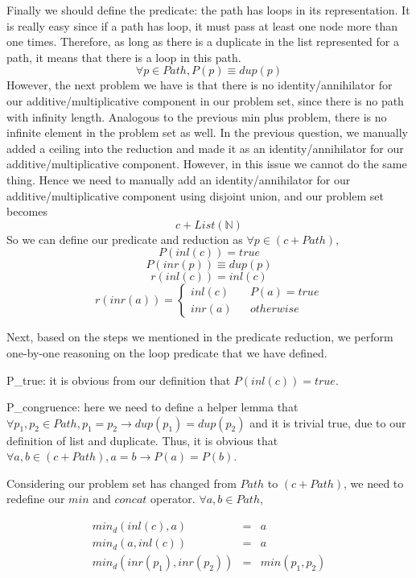 \documentclass[a4paper,10pt]{article}
\newcommand{\e}[2]{
\begin{equation}
  \label{#1} 
  #2
\end{equation}
}
\begin{document}
Finally we should define the predicate: the path has loops in its representation. It is really easy since if a path has loop, it must pass at least one node more than one times. 
Therefore, as long as there is a duplicate in the list represented for a path, it means that there is a loop in this path.
\[\forall p \in Path, P(p) \equiv dup(p)\]
However, the next problem we have is that there is no identity/annihilator for our additive/multiplicative component in our problem set, since there is no path with infinity length.
Analogous to the previous min plus problem, there is no infinite element in the problem set as well. In the previous question, we manually added a ceiling into the reduction and made it as an identity/annihilator for our additive/multiplicative component. However, in this issue we cannot do the same thing. 
Hence we need to manually add an identity/annihilator for our additive/multiplicative component using disjoint union, and our problem set becomes \[c + List(\mathbb{N})\]
So we can define our predicate and reduction as $\forall p \in (c + Path),$
\[ P(inl(c)) = true\]
\[ P(inr(p)) \equiv dup(p)\]
\[ r(inl(c)) = inl(c)\]
\[
r(inr (a)) =
\left\{
\begin{aligned}
inl(c) &  & P(a) = true \\
inr(a) &  & otherwise 
\end{aligned}
\right.\]

Next, based on the steps we mentioned in the predicate reduction, we perform one-by-one reasoning on the loop predicate that we have defined.

P\_true: it is obvious from our definition that $P(inl(c)) = true$.

P\_congruence: here we need to define a helper lemma that $\forall p_1,p_2 \in Path, p_1 = p_2 \rightarrow dup(p_1) = dup(p_2)$ and it is trivial true, due to our definition of list and duplicate. 
Thus, it is obvious that $\forall a,b \in (c + Path), a = b \rightarrow P(a) = P(b)$.

Considering our problem set has changed from $Path$ to $(c + Path)$, we need to redefine our $min$ and $concat$ operator. $\forall a,b \in Path,$
\e{pf:def:elementary_path_min_d}{
\begin{array}{rcl}
min_d(inl(c),a)	 & = & a \\
min_d(a,inl(c))	 & = & a \\
min_d(inr(p_1),inr(p_2))	 & = & min(p_1,p_2)\\
\end{array}
}
\end{document}
